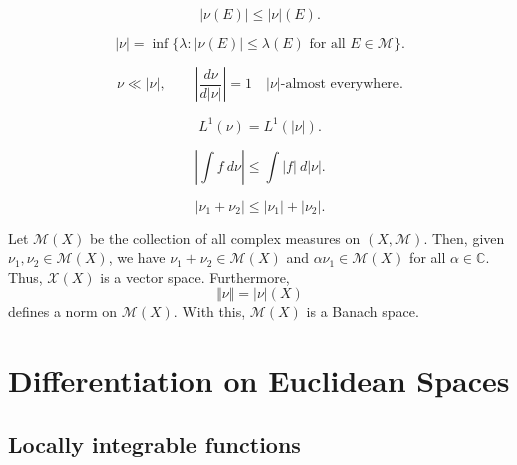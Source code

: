 \documentclass[11pt]{article}
\renewcommand{\C}{\mathbb{C}}
\newcommand{\M}{\mathcal{M}}
\theoremstyle{definition}
\theoremstyle{remark}
\begin{document}
    \begin{lemma}
        \[
            |\nu(E)| \leq |\nu|(E).
        \]
    \end{lemma}

    \begin{lemma}
        \[
            |\nu| = \inf\{\lambda : |\nu(E)| \leq \lambda(E) \text{ for all } E \in
            \M\}.
        \]
    \end{lemma}

    \begin{lemma}
        \[
            \nu \ll |\nu|, \qquad
            \left|\frac{d\nu}{d|\nu|}\right| = 1\quad|\nu|\text{-almost everywhere}.
        \]
    \end{lemma}

    \begin{lemma}
        \[
            L^1(\nu) = L^1(|\nu|).
        \]
    \end{lemma}

    \begin{lemma}
        \[
            |\int f\:d\nu| \leq \int |f|\:d|\nu|.
        \]
    \end{lemma}

    \begin{lemma}
        \[
            |\nu_1 + \nu_2| \leq |\nu_1| + |\nu_2|.
        \]
    \end{lemma}


    \begin{theorem}
        Let $\mathscr{M}(X)$ be the collection of all complex measures on $(X, \M)$.
        Then, given $\nu_1, \nu_2 \in \mathscr{M}(X)$, we have $\nu_1 + \nu_2 \in
        \mathscr{M}(X)$ and $\alpha\nu_1 \in \mathscr{M}(X)$ for all $\alpha \in \C$.
        Thus, $\mathscr{X}(X)$ is a vector space. Furthermore, \[
            \Vert \nu\Vert = |\nu|(X)
        \] defines a norm on $\mathscr{M}(X)$. With this, $\mathscr{M}(X)$ is a
        Banach space.
    \end{theorem}



    \section{Differentiation on Euclidean Spaces}


    \subsection{Locally integrable functions}
\end{document}
